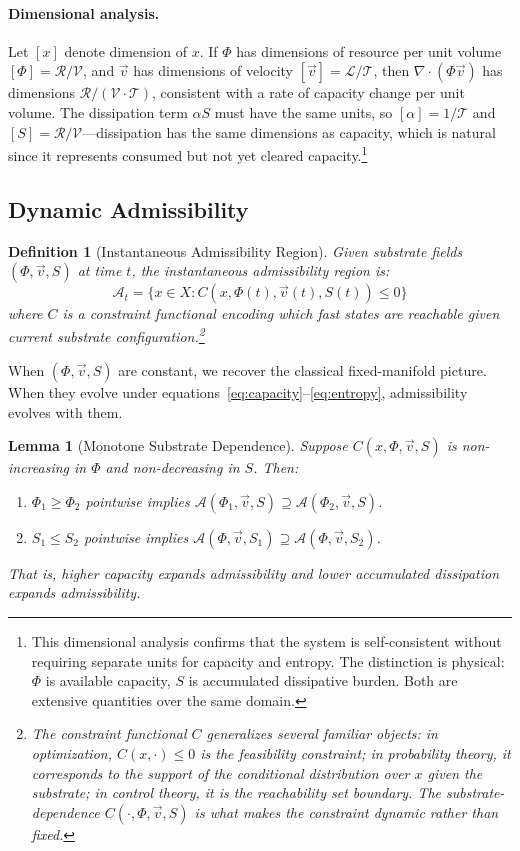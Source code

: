 \documentclass[12pt,a4paper]{article}
\newtheorem{lemma}[theorem]{Lemma}
\newtheorem{definition}[theorem]{Definition}
\begin{document}
\paragraph{Dimensional analysis.} Let $[x]$ denote dimension of $x$. If $\Phi$ has dimensions of resource per unit volume $[\Phi] = \mathcal{R}/\mathcal{V}$, and $\vec{v}$ has dimensions of velocity $[\vec{v}] = \mathcal{L}/\mathcal{T}$, then $\nabla \cdot (\Phi\vec{v})$ has dimensions $\mathcal{R}/(\mathcal{V}\cdot\mathcal{T})$, consistent with a rate of capacity change per unit volume. The dissipation term $\alpha S$ must have the same units, so $[\alpha] = 1/\mathcal{T}$ and $[S] = \mathcal{R}/\mathcal{V}$---dissipation has the same dimensions as capacity, which is natural since it represents consumed but not yet cleared capacity.\footnote{This dimensional analysis confirms that the system is self-consistent without requiring separate units for capacity and entropy. The distinction is physical: $\Phi$ is available capacity, $S$ is accumulated dissipative burden. Both are extensive quantities over the same domain.}

\subsection{Dynamic Admissibility}

\begin{definition}[Instantaneous Admissibility Region]
Given substrate fields $(\Phi, \vec{v}, S)$ at time $t$, the instantaneous admissibility region is:
\[
\mathcal{A}_t = \{ x \in X : C(x, \Phi(t), \vec{v}(t), S(t)) \leq 0 \}
\]
where $C$ is a constraint functional encoding which fast states are reachable given current substrate configuration.\footnote{The constraint functional $C$ generalizes several familiar objects: in optimization, $C(x,\cdot) \leq 0$ is the feasibility constraint; in probability theory, it corresponds to the support of the conditional distribution over $x$ given the substrate; in control theory, it is the reachability set boundary. The substrate-dependence $C(\cdot, \Phi, \vec{v}, S)$ is what makes the constraint dynamic rather than fixed.}
\end{definition}

When $(\Phi, \vec{v}, S)$ are constant, we recover the classical fixed-manifold picture. When they evolve under equations~\eqref{eq:capacity}--\eqref{eq:entropy}, admissibility evolves with them.

\begin{lemma}[Monotone Substrate Dependence]
\label{lem:monotone}
Suppose $C(x, \Phi, \vec{v}, S)$ is non-increasing in $\Phi$ and non-decreasing in $S$. Then:
\begin{enumerate}[label=(\roman*)]
  \item $\Phi_1 \geq \Phi_2$ pointwise implies $\mathcal{A}(\Phi_1, \vec{v}, S) \supseteq \mathcal{A}(\Phi_2, \vec{v}, S)$.
  \item $S_1 \leq S_2$ pointwise implies $\mathcal{A}(\Phi, \vec{v}, S_1) \supseteq \mathcal{A}(\Phi, \vec{v}, S_2)$.
\end{enumerate}
That is, higher capacity expands admissibility and lower accumulated dissipation expands admissibility.
\end{lemma}
\end{document}
